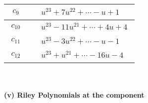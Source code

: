 \documentclass[1p]{elsarticle_modified}
\theoremstyle{definition}
\begin{document}
\begin{tabular}{m{50pt}|m{274pt}}
\hline $$\begin{aligned}c_{9}\end{aligned}$$&$\begin{aligned}
&u^{23}+7 u^{22}+\cdots- u+1
\end{aligned}$\\
\hline $$\begin{aligned}c_{10}\end{aligned}$$&$\begin{aligned}
&u^{23}-11 u^{21}+\cdots+4 u+4
\end{aligned}$\\
\hline $$\begin{aligned}c_{11}\end{aligned}$$&$\begin{aligned}
&u^{23}-3 u^{22}+\cdots- u-1
\end{aligned}$\\
\hline $$\begin{aligned}c_{12}\end{aligned}$$&$\begin{aligned}
&u^{23}+u^{21}+\cdots-16 u-4
\end{aligned}$\\
\hline
\end{tabular}\\~\\
\newpage\renewcommand{\arraystretch}{1}
\flushleft \textbf{(v) Riley Polynomials at the component}\newline \\
\end{document}

